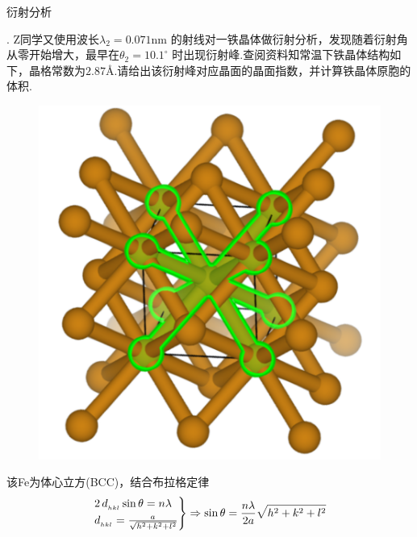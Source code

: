 \documentclass{beamer}
\begin{document}
\begin{frame}[t]{衍射分析}

    {
    . Z同学又使用波长$\lambda_2 = 0.071$nm 的射线对一铁晶体做衍射分析，发现随着衍射角从零开始增大，最早在$\theta_2 = 10.1^{\circ}$ 时出现衍射峰.查阅资料知常温下铁晶体结构如下，晶格常数为$2.87$\AA.请给出该衍射峰对应晶面的晶面指数，并计算铁晶体原胞的体积.
    } \par
    \begin{figure} %
    \vspace{-0.9cm}
	\begin{center}
		\includegraphics[width=0.93\linewidth]{5.png}
	\end{center}
    \end{figure}
    
    \vspace{0.15cm}
    \qquad 该Fe为体心立方(BCC)，结合布拉格定律
    \vspace{-0.2cm}
    \begin{equation*}
        \begin{rcases}
            2\, d_{_{hkl}} \sin \theta  = n \lambda \\
            d_{_{hkl}}   = \frac{a}{\sqrt{h^2 +k^2 +l^2}}
        \end{rcases}
        \Rightarrow \sin \theta = \frac{n\lambda}{2a}\sqrt{h^2 + k^2 + l^2}
    \end{equation*}\par
    \vspace{-0.1cm}
    

\end{frame}
\end{document}
